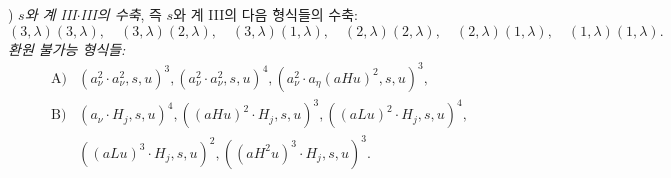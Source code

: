 
) \emph{$s$와 계 III$\cdot$III의 수축}, 즉 $s$와 계 III의 다음 형식들의 수축:
\[
(3,\lambda)(3,\lambda),\quad (3,\lambda)(2,\lambda),\quad (3,\lambda)(1,\lambda),\quad
(2,\lambda)(2,\lambda),\quad (2,\lambda)(1,\lambda),\quad
(1,\lambda)(1,\lambda).
\]
\noindent\emph{환원 불가능 형식들:}
\[
\begin{array}{rl}
\text{A)}&(a_\nu^2\cdot a_\nu^2,s,u)^3,
(a_\nu^2\cdot a_\nu^2,s,u)^4,
(a_\nu^2\cdot a_\eta(aHu)^2,s,u)^3,\\[0.45em]
\text{B)}&(a_\nu\cdot H_j,s,u)^4,
((aHu)^2\cdot H_j,s,u)^3,
((aLu)^2\cdot H_j,s,u)^4,\\[0.25em]
&((aLu)^3\cdot H_j,s,u)^2,
((aH^2u)^3\cdot H_j,s,u)^3.
\end{array}
\]
